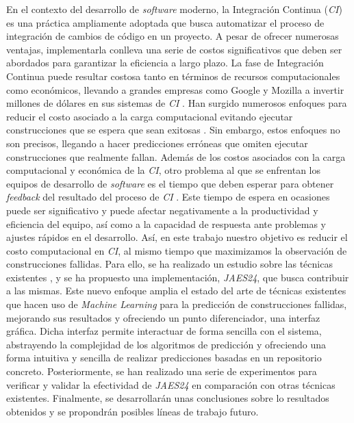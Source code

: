 En el contexto del desarrollo de \textit{software} moderno, la Integración Continua (\textit{CI}) es
una práctica ampliamente adoptada que busca automatizar el proceso de integración de cambios de
código en un proyecto. A pesar de ofrecer numerosas ventajas, implementarla conlleva una serie de
costos significativos que deben ser abordados para garantizar la eficiencia a largo plazo. La fase
de Integración Continua puede resultar costosa tanto en términos de recursos computacionales como
económicos, llevando a grandes empresas como Google y Mozilla a invertir millones de dólares en
sus sistemas de \textit{CI} \cite{1}. Han surgido numerosos enfoques para reducir el costo asociado
a la carga computacional evitando ejecutar construcciones que se espera que sean exitosas
\cite{2}. Sin embargo, estos enfoques no son precisos, llegando a  hacer predicciones erróneas que
omiten ejecutar construcciones que realmente fallan. Además de los costos asociados con la carga
computacional y económica de la \textit{CI}, otro problema al que se enfrentan los equipos de
desarrollo de \textit{software} es el tiempo que deben esperar para obtener \textit{feedback} del
resultado del proceso de \textit{CI} \cite{3}. Este tiempo de espera en ocasiones puede ser
significativo y puede afectar negativamente a la productividad y eficiencia del equipo, así como
a la capacidad de respuesta ante problemas y ajustes rápidos en el desarrollo. Así, en este
trabajo nuestro objetivo es reducir el costo computacional en \textit{CI}, al mismo tiempo que
maximizamos la observación de construcciones fallidas. Para ello, se ha realizado un estudio
sobre las técnicas existentes \cite{2,4,5,6,7,8}, y se ha propuesto una implementación,
\textit{JAES24}, que busca contribuir a las mismas. Este nuevo enfoque amplia el estado del arte
de técnicas existentes que hacen uso de \textit{Machine Learning} para la predicción de construcciones
fallidas, mejorando sus resultados y ofreciendo un punto diferenciador, una interfaz gráfica. Dicha
interfaz permite interactuar de forma sencilla con el sistema, abstrayendo la complejidad de los
algoritmos de predicción y ofreciendo una forma intuitiva y sencilla de realizar predicciones basadas
en un repositorio concreto. Posteriormente, se han realizado una serie de experimentos para verificar
y validar la efectividad de \textit{JAES24} en comparación con otras técnicas existentes. Finalmente,
se desarrollarán unas conclusiones sobre lo resultados obtenidos y se propondrán posibles líneas de
trabajo futuro.

